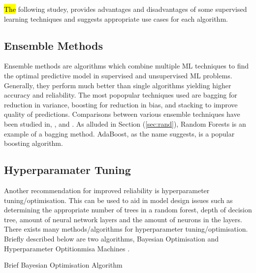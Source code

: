\hl{The} following studey, \cite{7724478} provides advantages and disadvantages of some supervised learning techniques and suggests appropriate use cases for each algorithm.


\subsection{Ensemble Methods}
Ensemble methods are algorithms which combine multiple ML techniques to find the optimal predictive model in supervised and unsupervised ML problems.
Generally, they perform much better than single algorithms yielding higher accuracy and reliability.
The most popopular techniques used are bagging for reduction in variance, boosting for reduction in bias, and stacking to improve quality of predictions.
Comparisons between various ensemble techniques have been studied in, \cite{7340924}, \cite{8389056} and \cite{1358033}.
As alluded in Section (\ref{sec:rand}), Random Forests is an example of a bagging method. AdaBoost, as the name suggests, is a popular boosting algorithm.

\subsection{Hyperparamater Tuning}
Another recommendation for improved reliability is hyperparameter tuning/optimisation.
This can be used to aid in model design issues such as determining the appropriate number of trees in a random forest,
depth of decision tree, amount of neural network layers and the amount of neurons in the layers.
There exists many methods/algorithms for hyperparameter tuning/optimisation. 
Briefly described below are two algorithms, Bayesian Optimisation \cite{7900023} and Hyperparameter Optitionmisa Machines \cite{7796889}.

\begin{algorithm}[H]
    \SetAlgoLined
    \caption{Brief Bayesian Optimisation Algorithm \cite{7900023}}
\end{algorithm}

